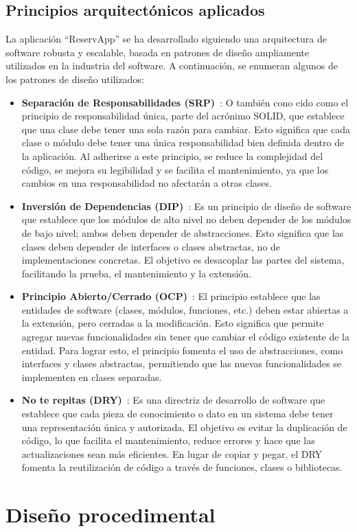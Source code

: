 \subsection{Principios arquitectónicos aplicados}
La aplicación ``ReservApp'' se ha desarrollado siguiendo una arquitectura de software robusta y escalable, basada en patrones de diseño ampliamente utilizados en la industria del software. A continuación, se enumeran algunos de los patrones de diseño utilizados:

\begin{itemize}
    \item \textbf{Separación de Responsabilidades (SRP)}~\cite{principio-srp}: O también cono cido como el principio de responsabilidad única, parte del acrónimo SOLID, que establece que una clase debe tener una sola razón para cambiar. Esto significa que cada clase o módulo debe tener una única responsabilidad bien definida dentro de la aplicación. Al adherirse a este principio, se reduce la complejidad del código, se mejora su legibilidad y se facilita el mantenimiento, ya que los cambios en una responsabilidad no afectarán a otras clases.
    \item \textbf{Inversión de Dependencias (DIP)}~\cite{patron-repository}: Es un principio de diseño de software que establece que los módulos de alto nivel no deben depender de los módulos de bajo nivel; ambos deben depender de abstracciones. Esto significa que las clases deben depender de interfaces o clases abstractas, no de implementaciones concretas. El objetivo es desacoplar las partes del sistema, facilitando la prueba, el mantenimiento y la extensión.
    \item \textbf{Principio Abierto/Cerrado (OCP)}~\cite{principio-ocp}: El principio establece que las entidades de software (clases, módulos, funciones, etc.) deben estar abiertas a la extensión, pero cerradas a la modificación. Esto significa que permite agregar nuevas funcionalidades sin tener que cambiar el código existente de la entidad. Para lograr esto, el principio fomenta el uso de abstracciones, como interfaces y clases abstractas, permitiendo que las nuevas funcionalidades se implementen en clases separadas.
    \item \textbf{No te repitas (DRY)}~\cite{principio-dry}: Es una directriz de desarrollo de software que establece que cada pieza de conocimiento o dato en un sistema debe tener una representación única y autorizada. El objetivo es evitar la duplicación de código, lo que facilita el mantenimiento, reduce errores y hace que las actualizaciones sean más eficientes. En lugar de copiar y pegar, el DRY fomenta la reutilización de código a través de funciones, clases o bibliotecas.
\end{itemize}

\newpage

\section{Diseño procedimental}



